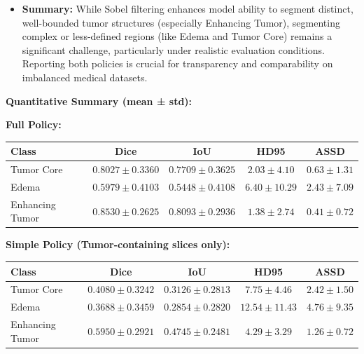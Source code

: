\begin{itemize}
    \item \textbf{Summary:}
    While Sobel filtering enhances model ability to segment distinct, well-bounded tumor structures (especially Enhancing Tumor), segmenting complex or less-defined regions (like Edema and Tumor Core) remains a significant challenge, particularly under realistic evaluation conditions. Reporting both policies is crucial for transparency and comparability on imbalanced medical datasets.
\end{itemize}

\clearpage

\textbf{Quantitative Summary (mean ± std):}

\vspace{1em}
\noindent\textbf{Full Policy:}

\begin{center}
\begin{tabular}{lcccc}
\toprule
\textbf{Class} & \textbf{Dice} & \textbf{IoU} & \textbf{HD95} & \textbf{ASSD} \\
\midrule
Tumor Core       & $0.8027 \pm 0.3360$ & $0.7709 \pm 0.3625$ & $2.03 \pm 4.10$ & $0.63 \pm 1.31$ \\
Edema            & $0.5979 \pm 0.4103$ & $0.5448 \pm 0.4108$ & $6.40 \pm 10.29$ & $2.43 \pm 7.09$ \\
Enhancing Tumor  & $0.8530 \pm 0.2625$ & $0.8093 \pm 0.2936$ & $1.38 \pm 2.74$ & $0.41 \pm 0.72$ \\
\bottomrule
\end{tabular}
\end{center}

\vspace{1em}
\noindent\textbf{Simple Policy (Tumor-containing slices only):}

\begin{center}
\begin{tabular}{lcccc}
\toprule
\textbf{Class} & \textbf{Dice} & \textbf{IoU} & \textbf{HD95} & \textbf{ASSD} \\
\midrule
Tumor Core       & $0.4080 \pm 0.3242$ & $0.3126 \pm 0.2813$ & $7.75 \pm 4.46$  & $2.42 \pm 1.50$ \\
Edema            & $0.3688 \pm 0.3459$ & $0.2854 \pm 0.2820$ & $12.54 \pm 11.43$ & $4.76 \pm 9.35$ \\
Enhancing Tumor  & $0.5950 \pm 0.2921$ & $0.4745 \pm 0.2481$ & $4.29 \pm 3.29$  & $1.26 \pm 0.72$ \\
\bottomrule
\end{tabular}
\end{center}

